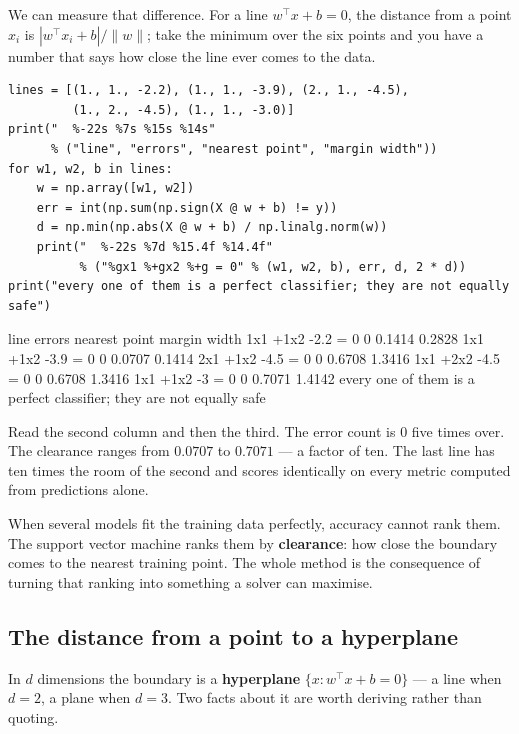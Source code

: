 \documentclass[11pt]{article}
\begin{document}
We can measure that difference. For a line $w^\top x + b = 0$, the distance
from a point $x_i$ is $|w^\top x_i + b| / \|w\|$; take the minimum over the
six points and you have a number that says how close the line ever comes to
the data.

\begin{lstlisting}
lines = [(1., 1., -2.2), (1., 1., -3.9), (2., 1., -4.5),
         (1., 2., -4.5), (1., 1., -3.0)]
print("  %-22s %7s %15s %14s"
      % ("line", "errors", "nearest point", "margin width"))
for w1, w2, b in lines:
    w = np.array([w1, w2])
    err = int(np.sum(np.sign(X @ w + b) != y))
    d = np.min(np.abs(X @ w + b) / np.linalg.norm(w))
    print("  %-22s %7d %15.4f %14.4f"
          % ("%gx1 %+gx2 %+g = 0" % (w1, w2, b), err, d, 2 * d))
print("every one of them is a perfect classifier; they are not equally safe")
\end{lstlisting}
\begin{codeout}
  line                    errors   nearest point   margin width
  1x1 +1x2 -2.2 = 0            0          0.1414         0.2828
  1x1 +1x2 -3.9 = 0            0          0.0707         0.1414
  2x1 +1x2 -4.5 = 0            0          0.6708         1.3416
  1x1 +2x2 -4.5 = 0            0          0.6708         1.3416
  1x1 +1x2 -3 = 0              0          0.7071         1.4142
every one of them is a perfect classifier; they are not equally safe
\end{codeout}

Read the second column and then the third. The error count is $0$ five times
over. The clearance ranges from $0.0707$ to $0.7071$ --- a factor of ten. The
last line has ten times the room of the second and scores identically on every
metric computed from predictions alone.

\begin{keyidea}
When several models fit the training data perfectly, accuracy cannot rank
them. The support vector machine ranks them by \textbf{clearance}: how close
the boundary comes to the nearest training point. The whole method is the
consequence of turning that ranking into something a solver can maximise.
\end{keyidea}

\subsection{The distance from a point to a hyperplane}
\label{sec:distance}

In $d$ dimensions the boundary is a \textbf{hyperplane}
$\{x : w^\top x + b = 0\}$ --- a line when $d = 2$, a plane when $d = 3$. Two
facts about it are worth deriving rather than quoting.
\end{document}
